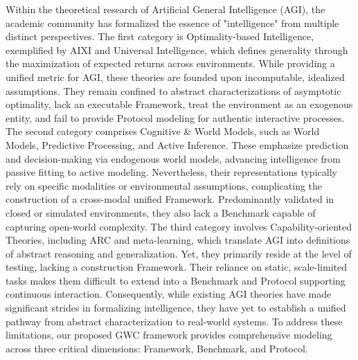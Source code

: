 Within the theoretical research of Artificial General Intelligence (AGI), the academic community has formalized the essence of "intelligence" from multiple distinct perspectives. The first category is Optimality-based Intelligence, exemplified by AIXI and Universal Intelligence, which defines generality through the maximization of expected returns across environments. While providing a unified metric for AGI, these theories are founded upon incomputable, idealized assumptions. They remain confined to abstract characterizations of asymptotic optimality, lack an executable Framework, treat the environment as an exogenous entity, and fail to provide Protocol modeling for authentic interactive processes. The second category comprises Cognitive \& World Models, such as World Models, Predictive Processing, and Active Inference. These emphasize prediction and decision-making via endogenous world models, advancing intelligence from passive fitting to active modeling. Nevertheless, their representations typically rely on specific modalities or environmental assumptions, complicating the construction of a cross-modal unified Framework. Predominantly validated in closed or simulated environments, they also lack a Benchmark capable of capturing open-world complexity. The third category involves Capability-oriented Theories, including ARC and meta-learning, which translate AGI into definitions of abstract reasoning and generalization. Yet, they primarily reside at the level of testing, lacking a construction Framework. Their reliance on static, scale-limited tasks makes them difficult to extend into a Benchmark and Protocol supporting continuous interaction. Consequently, while existing AGI theories have made significant strides in formalizing intelligence, they have yet to establish a unified pathway from abstract characterization to real-world systems. To address these limitations, our proposed GWC framework provides comprehensive modeling across three critical dimensions: Framework, Benchmark, and Protocol.